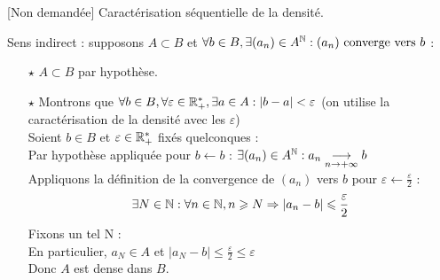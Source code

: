 \documentclass{article}
\renewenvironment{question_kholle}[2][ ]
{
	\subsection{\texorpdfstring{#2}{}}
	\notblank{#1}
	{
		\noindent #1
		\bigbreak
	}
	{}
	\begin{proof}
}
{
	\end{proof}
}
\begin{document}
\begin{question_kholle}
	{[Non demandée]
		Caractérisation séquentielle
		de la densité.}

	Sens indirect : supposons $A
		\subset B$ et $\forall b \in
		B, \exists(a_{n}) \in A^{\mathbb N}
		: (a_{n}) \text{ converge vers }b$ :\\
	\begin{itemize}
		\item[$\star$] $A \subset
			      B$ par hypothèse.
		\item[$\star$] Montrons que
		      $\forall b \in B, \forall
			      \varepsilon \in
			      \mathbb R^{*}_{+}, \exists a \in
			      A : |b - a| <
			      \varepsilon$ (on utilise
		      la caractérisation de la
		      densité avec les $\varepsilon$) \\
		      Soient $b \in B$ et
		      $\varepsilon \in
			      \mathbb R^{*}_{+}$ fixés quelconques : \\
		      Par hypothèse appliquée
		      pour $b \leftarrow b$ :
		      $\exists(a_{n}) \in
			      A^{\mathbb N} : a_{n}
			      \underset{n \to
				      +\infty}{\longrightarrow}b$ \\
		      Appliquons la définition
		      de la convergence de
		      $(a_{n})$ vers $b$ pour
		      $\varepsilon \leftarrow
			      \frac{\varepsilon}{2}$ : \\
		      $$\exists N \in \mathbb N :
			      \forall n \in \mathbb N, n
			      \geqslant N \Rightarrow
			      |a_{n} - b| \leqslant
			      \frac{\varepsilon}{2}$$
		      Fixons un tel N : \\
		      En particulier, $a_{N}
			      \in A$ et $|a_{N} - b|
			      \leqslant
			      \frac{\varepsilon}{2}
			      \leqslant \varepsilon$ \\
		      Donc $A$ est dense dans $B$.
	\end{itemize}


\end{question_kholle}
\end{document}
